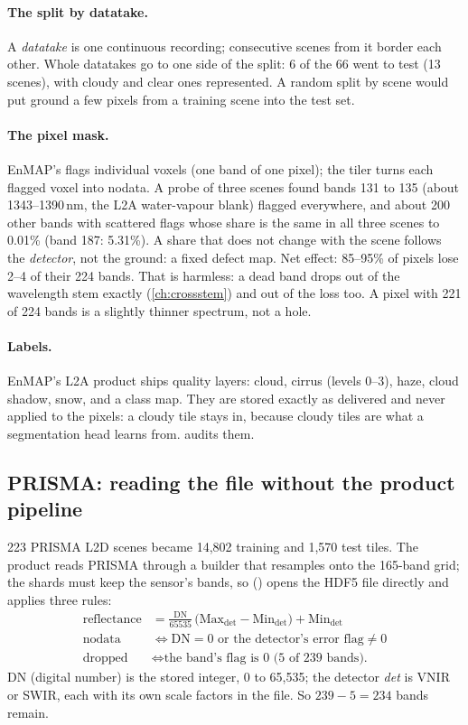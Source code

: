 \paragraph{The split by datatake.} A \emph{datatake} is one continuous recording; consecutive scenes from it
border each other. Whole datatakes go to one side of the split: 6 of the 66 went to test (13 scenes), with cloudy and clear
ones represented. A random split by scene would put ground a few pixels from a training scene into the test set.

\paragraph{The pixel mask.} EnMAP's  flags individual voxels (one band of one pixel); the tiler turns each
flagged voxel into nodata. A probe of three scenes found bands 131 to 135 (about 1343--1390\,nm, the L2A water-vapour blank)
flagged everywhere, and about 200 other bands with scattered flags whose share is the same in all three scenes to 0.01\%
(band 187: 5.31\%). A share that does not change with the scene follows the \emph{detector}, not the ground: a fixed defect map.
Net effect: 85--95\% of pixels lose 2--4 of their 224 bands. That is harmless: a dead band drops out of the wavelength stem
exactly (\cref{ch:crossstem}) and out of the loss too. A pixel with 221 of 224 bands is a slightly thinner spectrum, not a hole.

\paragraph{Labels.} EnMAP's L2A product ships quality layers: cloud, cirrus (levels 0--3), haze, cloud shadow, snow, and a class
map. They are stored exactly as delivered and never applied to the pixels: a cloudy tile stays in, because cloudy tiles are what
a segmentation head learns from.  audits them.

\subsection{PRISMA: reading the file without the product pipeline}

223 PRISMA L2D scenes became 14,802 training and 1,570 test tiles.\tbrk{} The product reads PRISMA
through a builder that resamples onto the 165-band grid; the shards must keep the sensor's bands, so 
() opens the HDF5 file directly and applies three rules:
\begin{align*}
  \text{reflectance} &= \frac{\text{DN}}{65535}\,\bigl(\text{Max}_{\text{det}} - \text{Min}_{\text{det}}\bigr) + \text{Min}_{\text{det}}\\
  \text{nodata} &\iff \text{DN} = 0 \text{ or the detector's error flag} \ne 0\\
  \text{dropped} &\iff \text{the band's flag is 0 (5 of 239 bands).}
\end{align*}
DN (digital number) is the stored integer, 0 to 65,535; the detector \emph{det} is VNIR or SWIR, each with its own scale
factors in the file. So $239 - 5 = 234$ bands remain.

